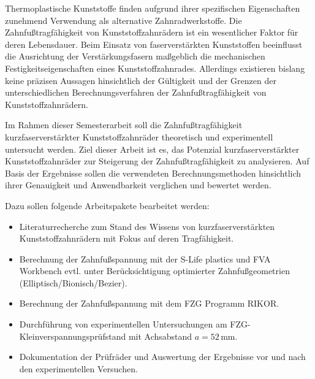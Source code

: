 \begingroup{}
Thermoplastische Kunststoffe finden aufgrund ihrer spezifischen Eigenschaften zunehmend Verwendung als alternative Zahnradwerkstoffe. Die Zahnfußtragfähigkeit von Kunststoffzahnrädern ist ein wesentlicher Faktor für deren Lebensdauer. Beim Einsatz von faserverstärkten Kunststoffen beeinflusst die Ausrichtung der Verstärkungsfasern maßgeblich die mechanischen Festigkeitseigenschaften eines Kunststoffzahnrades. Allerdings existieren bislang keine präzisen Aussagen hinsichtlich der Gültigkeit und der Grenzen der unterschiedlichen Berechnungsverfahren der Zahnfußtragfähigkeit von Kunststoffzahnrädern.\par\endgroup

Im Rahmen dieser Semesterarbeit soll die Zahnfußtragfähigkeit kurzfaserverstärkter Kunststoffzahnräder theoretisch und experimentell untersucht werden. Ziel dieser Arbeit ist es, das Potenzial kurzfaserverstärkter Kunststoffzahnräder zur Steigerung der Zahnfußtragfähigkeit zu analysieren. Auf Basis der Ergebnisse sollen die verwendeten Berechnungsmethoden hinsichtlich ihrer Genauigkeit und Anwendbarkeit verglichen und bewertet werden.

Dazu sollen folgende Arbeitspakete bearbeitet werden:
\begin{itemize}
    \item Literaturrecherche zum Stand des Wissens von kurzfaserverstärkten Kunststoffzahnrädern mit Fokus auf deren Tragfähigkeit.
    \item Berechnung der Zahnfußspannung mit der S-Life plastics und FVA Workbench evtl. unter Berücksichtigung optimierter Zahnfußgeometrien (Elliptisch/Bionisch/Bezier).
    \item Berechnung der Zahnfußspannung mit dem FZG Programm RIKOR.
    \item Durchführung von experimentellen Untersuchungen am FZG-Klein\-ver\-span\-nungs\-prüf\-stand mit Achsabstand $a = 52\,\text{mm}$.
    \item Dokumentation der Prüfräder und Auswertung der Ergebnisse vor und nach den experimentellen Versuchen.
\end{itemize}

